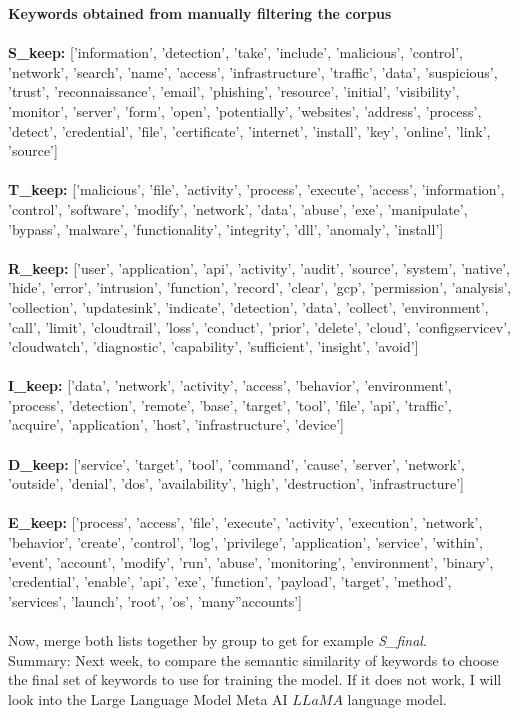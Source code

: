 \textbf{Keywords obtained from manually filtering the corpus}\\\\
\textbf{S\_keep:} ['information', 'detection', 'take',  'include', 'malicious', 'control', 'network', 'search', 'name', 'access', 'infrastructure', 'traffic', 'data', 'suspicious', 'trust', 'reconnaissance', 'email', 'phishing', 'resource', 'initial', 'visibility', 'monitor', 'server', 'form', 'open', 'potentially', 'websites', 'address', 'process', 'detect', 'credential', 'file', 'certificate', 'internet', 'install', 'key', 'online', 'link', 'source'] \\\\
\textbf{T\_keep:} ['malicious', 'file', 'activity', 'process', 'execute', 'access', 'information', 'control', 'software', 'modify', 'network', 'data', 'abuse', 'exe', 'manipulate', 'bypass', 'malware', 'functionality', 'integrity', 'dll', 'anomaly', 'install'] \\\\
\textbf{R\_keep:} ['user', 'application', 'api', 'activity', 'audit', 'source', 'system', 'native', 'hide', 'error', 'intrusion', 'function', 'record', 'clear', 'gcp', 'permission', 'analysis', 'collection', 'updatesink', 'indicate', 'detection', 'data', 'collect', 'environment', 'call', 'limit', 'cloudtrail', 'loss', 'conduct', 'prior', 'delete', 'cloud', 'configservicev', 'cloudwatch', 'diagnostic', 'capability', 'sufficient', 'insight', 'avoid'] \\\\
\textbf{I\_keep:} ['data', 'network', 'activity', 'access', 'behavior', 'environment', 'process', 'detection', 'remote', 'base', 'target', 'tool', 'file', 'api', 'traffic', 'acquire', 'application', 'host', 'infrastructure', 'device'] \\\\
\textbf{D\_keep:} ['service', 'target', 'tool', 'command', 'cause', 'server', 'network', 'outside', 'denial', 'dos', 'availability', 'high', 'destruction', 'infrastructure'] \\\\
\textbf{E\_keep:} ['process', 'access', 'file', 'execute', 'activity', 'execution', 'network', 'behavior', 'create', 'control', 'log', 'privilege', 'application', 'service', 'within', 'event', 'account', 'modify', 'run', 'abuse', 'monitoring', 'environment', 'binary', 'credential', 'enable', 'api', 'exe', 'function', 'payload', 'target', 'method', 'services', 'launch', 'root', 'os', 'many''accounts'] \\\\

Now, merge both lists together by group to get for example \textit{S\_final}. \\

Summary: Next week, to compare the semantic similarity of keywords to choose the final set of keywords to use for training the model. If it does not work, I will look into the Large Language Model Meta AI \(LLaMA\) language model.